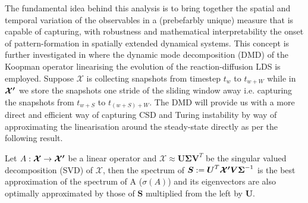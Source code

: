 \documentclass[../main.tex]{subfiles}
\begin{document}
The fundamental idea behind this analysis is to bring together the spatial and temporal variation of the observables in a (prebefarbly unique) measure that is capable of capturing, with robustness and mathematical interpretability the onset of pattern-formation in spatially extended dynamical systems.
This concept is further investigated in \cite{Donovan22} where the dynamic mode decomposition (DMD) of the Koopman operator linearising the evolution of the reaction-diffusion LDS is employed.
Suppose $\boldsymbol{\mathcal{X}}$ is collecting snapshots from timestep $t_{w}$ to $t_{w+W}$ while in $\boldsymbol{\mathcal{X'}}$ we store the snapshots one stride of the sliding window away i.e. capturing the snapshots from $t_{w+S}$ to $t_{(w+S)+W}$.
The DMD will provide us with a more direct and efficient way of capturing CSD and Turing instability by way of approximating the linearisation around the steady-state directly as per the following result.
\begin{theorem}[label=thm3.6]{}{}
     Let $A:\boldsymbol{\mathcal{X}}\to \boldsymbol{\mathcal{X'}}$ be a linear operator and $\boldsymbol{\mathcal{X}}\approx \boldsymbol{U}\boldsymbol{\Sigma}\boldsymbol{V}^{T}$ be the singular valued decomposition (SVD) of $\boldsymbol{\mathcal{X}}$, then the spectrum of $\boldsymbol{S}:= \boldsymbol{U}^{T}\boldsymbol{\mathcal{X'}}\boldsymbol{V}\boldsymbol{\Sigma}^{-1}$ is the best approximation of the spectrum of A ($\sigma(A)$) and its eigenvectors are also optimally approximated by those of $\boldsymbol{S}$ multiplied from the left by $\boldsymbol{U}$.
\end{theorem}
\end{document}

